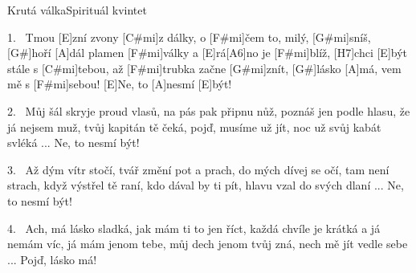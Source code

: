 \begin{song}{Krutá válka}{Spirituál kvintet}

\begin{xverse}{1.~}
Tmou [\large E]zní zvony [\large C#mi]z dálky, o [\large F#mi]{}čem to, milý, [\large G#mi]sníš,
[\large G#]hoří [\large A]dál plamen [\large F#mi]války a [\large E]rá[\large A6]no je [\large F#mi]blíž,
[\large H7]chci [\large E]být stále s [\large C#mi]tebou, až [\large F#mi]trubka začne [\large G#mi]znít,
[\large G#]lásko [\large A]má, vem mě s [\large F#mi]sebou! [\large E]Ne, to [\large A]nesmí [\large E]být!
\end{xverse}

\begin{xverse}{2.~}
Můj šál skryje proud vlasů, na pás pak připnu nůž,
poznáš jen podle hlasu, že já nejsem muž,
tvůj kapitán tě čeká, pojď, musíme už jít,
noc už svůj kabát svléká ... Ne, to nesmí být!
\end{xverse}

\begin{xverse}{3.~}
Až dým vítr stočí, tvář změní pot a prach,
do mých dívej se očí, tam není strach,
když výstřel tě raní, kdo dával by ti pít,
hlavu vzal do svých dlaní ... Ne, to nesmí být!
\end{xverse}

\begin{xverse}{4.~}
Ach, má lásko sladká, jak mám ti to jen říct,
každá chvíle je krátká a já nemám víc,
já mám jenom tebe, můj dech jenom tvůj zná,
nech mě jít vedle sebe ... Pojď, lásko má!
\end{xverse}

\end{song}
\chords{\chordASix}

